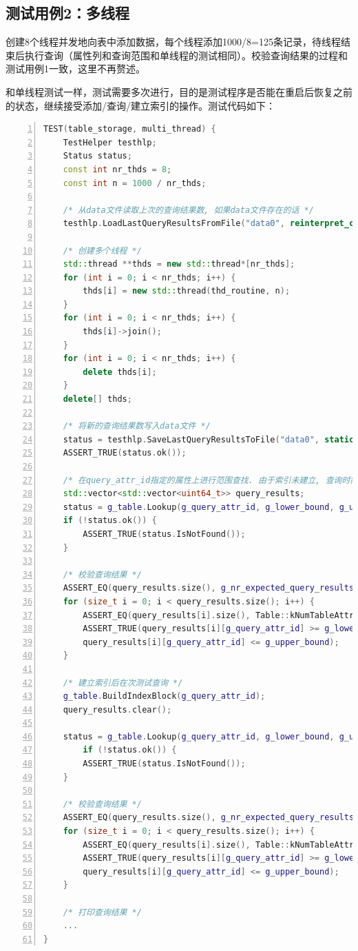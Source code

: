 \documentclass[bachelor]{thesis-uestc}
\begin{document}
\subsection{测试用例2：多线程}
创建8个线程并发地向表中添加数据，每个线程添加1000/8=125条记录，待线程结束后执行查询（属性列和查询范围和单线程的测试相同）。校验查询结果的过程和测试用例1一致，这里不再赘述。\par
和单线程测试一样，测试需要多次进行，目的是测试程序是否能在重启后恢复之前的状态，继续接受添加/查询/建立索引的操作。测试代码如下：

\begin{lstlisting}[language=C++, basicstyle=\ttfamily\tiny, numbers=left, numberstyle=\tiny, keywordstyle=\color{blue!70}, commentstyle=\color{red!50!green!50!blue!50}, frame=shadowbox, rulesepcolor=\color{red!20!green!20!blue!20}]
TEST(table_storage, multi_thread) {
	TestHelper testhlp;
	Status status;
	const int nr_thds = 8;
	const int n = 1000 / nr_thds;

	/* 从data文件读取上次的查询结果数, 如果data文件存在的话 */
	testhlp.LoadLastQueryResultsFromFile("data0", reinterpret_cast<int*>(&g_nr_expected_query_results));

	/* 创建多个线程 */
	std::thread **thds = new std::thread*[nr_thds];
	for (int i = 0; i < nr_thds; i++) {
		thds[i] = new std::thread(thd_routine, n);
	}
	for (int i = 0; i < nr_thds; i++) {
		thds[i]->join();
	}
	for (int i = 0; i < nr_thds; i++) {
		delete thds[i];
	}
	delete[] thds;

	/* 将新的查询结果数写入data文件 */
	status = testhlp.SaveLastQueryResultsToFile("data0", static_cast<int>(g_nr_expected_query_results));
	ASSERT_TRUE(status.ok());

	/* 在query_attr_id指定的属性上进行范围查找. 由于索引未建立, 查询时需要读取table_file */
	std::vector<std::vector<uint64_t>> query_results;
	status = g_table.Lookup(g_query_attr_id, g_lower_bound, g_upper_bound, &query_results);
	if (!status.ok()) {
		ASSERT_TRUE(status.IsNotFound());
	}

	/* 校验查询结果 */
	ASSERT_EQ(query_results.size(), g_nr_expected_query_results);
	for (size_t i = 0; i < query_results.size(); i++) {
		ASSERT_EQ(query_results[i].size(), Table::kNumTableAttributes);
		ASSERT_TRUE(query_results[i][g_query_attr_id] >= g_lower_bound &&
		query_results[i][g_query_attr_id] <= g_upper_bound);
	}

	/* 建立索引后在次测试查询 */
	g_table.BuildIndexBlock(g_query_attr_id);
	query_results.clear();

	status = g_table.Lookup(g_query_attr_id, g_lower_bound, g_upper_bound, &query_results);
		if (!status.ok()) {
		ASSERT_TRUE(status.IsNotFound());
	}

	/* 校验查询结果 */
	ASSERT_EQ(query_results.size(), g_nr_expected_query_results);
	for (size_t i = 0; i < query_results.size(); i++) {
		ASSERT_EQ(query_results[i].size(), Table::kNumTableAttributes);
		ASSERT_TRUE(query_results[i][g_query_attr_id] >= g_lower_bound &&
		query_results[i][g_query_attr_id] <= g_upper_bound);
	}

	/* 打印查询结果 */
	...
}
\end{lstlisting}
\end{document}

